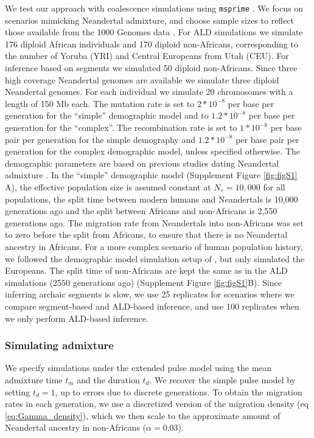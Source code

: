 \documentclass[11pt]{article}
\begin{document}
We test our approach with coalescence simulations using  \texttt{msprime} 
\citep{kelleher_efficient_2016}. We focus on scenarios mimicking Neandertal admixture, and choose sample sizes to reflect those available from the 1000 Genomes data \citep{the_1000_genomes_project_consortium_global_2015}. For ALD simulations we simulate 176 diploid
African individuals and 170 diploid non-Africans, corresponding to the
number of Yoruba (YRI) and Central Europeans from Utah (CEU). For inference based on segments we simulated 50 diploid non-Africans.
Since three high coverage Neandertal genomes are available \citep{prufer_complete_2013,prufer_high-coverage_2017,mafessoni_high_coverage_2020} we  simulate three diploid Neandertal genomes. For each individual we simulate 20
chromosomes with a length of 150 Mb each. The mutation rate is set to
 \(2*10^{-8}\) per base per generation for the ``simple'' demographic model and to  \(1.2*10^{-8}\) per base per generation for the ``complex''. The
recombination rate is set to \(1*10^{-8}\) per base pair per generation for the simple demography and \(1.2*10^{-8}\) per base pair per generation for the complex demographic model,
unless specified otherwise. The demographic parameters are based on
previous studies dating Neandertal admixture
\citep{sankararaman_date_2012,fu_genome_2014,moorjani_genetic_2016,skov_detecting_2018}. In
the ``simple'' demographic model (Supplement Figure  \ref{fig:figS1} A), the effective
population size is assumed constant at $N_e=10,000$ for all populations, the
split time between modern humans and Neandertals is 10,000 generations
ago and the split between Africans and non-Africans is 2,550
generations ago. The migration rate from Neandertals into non-Africans
was set to zero before the split from Africans, to ensure that there is no Neandertal
ancestry in Africans.  For a more complex scenario of human population history, we followed the demographic model simulation setup of \cite{skov_detecting_2018}, but only simulated the Europeans. The split time of  non-Africans are kept the same as in the ALD simulations (2550 generations ago) (Supplement Figure \ref{fig:figS1}B). Since inferring archaic segments is slow, we use 25 replicates for scenarios where we compare segment-based and ALD-based inference, and use 100 replicates when we only perform ALD-based inference. 


\subsubsection{Simulating admixture}\label{Simulating the expanded pulse}
We specify simulations under the extended pulse model using the mean admixture time $t_m$ and the duration $t_d$. We recover the simple pulse model by setting $t_d=1$, up to errors due to discrete generations. To obtain the migration rates in each generation, we use a discretized version of the migration density (eq \ref{eq:Gamma_density}), which we then scale to the approximate amount of Neandertal ancestry in non-Africans ($\alpha = 0.03$). 
\end{document}
